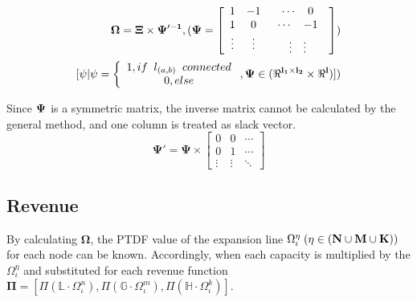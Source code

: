 \documentclass[journal]{IEEEtran} %
\begin{document}
\begin{equation}
\begin{aligned}
\boldsymbol{\Omega} = \bf{\Xi} \times\bf{\Psi}'^{-1}, (\bf{\Psi = \left[ {\begin{array}{*{20}{c}}
1&{ - 1}&{\begin{array}{*{20}{c}}
 \cdots &0
\end{array}}\\
1&0&{\begin{array}{*{20}{c}}
 \cdots &{ - 1}
\end{array}}\\
 \vdots & \vdots &{\begin{array}{*{20}{c}}
 \vdots & \vdots 
\end{array}}
\end{array}} \right]})\\
[\psi|\psi = \left\{ {\begin{array}{*{20}{c}}
 {1,if\;\;{l_{(a,b)}}\;\;connected}\\
 {0,else}
\end{array}} \right., \bf{\Psi} \in (\Re^{l_{1} \times l_{2}} \times \Re^{l})])
\end{aligned}
\end{equation}

Since $\bf{\Psi}$ is a symmetric matrix, the inverse matrix cannot be calculated by the general method, and one column is treated as slack vector.
\begin{equation}
\boldsymbol{\Psi} ' = \boldsymbol{\Psi}  \times \left[ {\begin{array}{*{20}{c}}
0&0& \cdots \\
0&1& \cdots \\
 \vdots & \vdots & \ddots 
\end{array}} \right]
\end{equation}

\subsection{Revenue}
By calculating $\boldsymbol{\Omega}$, the PTDF value of the expansion line $\Omega_{\iota}^{\eta} \;(\eta \in (\bf{N} \cup \bf{M} \cup \bf{K}))$ for each node can be known. Accordingly, when each capacity is multiplied by the $\Omega_{\iota}^{\eta}$ and substituted for each revenue function $\boldsymbol{\Pi} = [\Pi(\mathbb{L} \cdot \Omega_{\iota}^{n}), \Pi(\mathbb{G} \cdot \Omega_{\iota}^{m}), \Pi(\mathbb{H} \cdot \Omega_{\iota}^{k})]$. 
\end{document}
